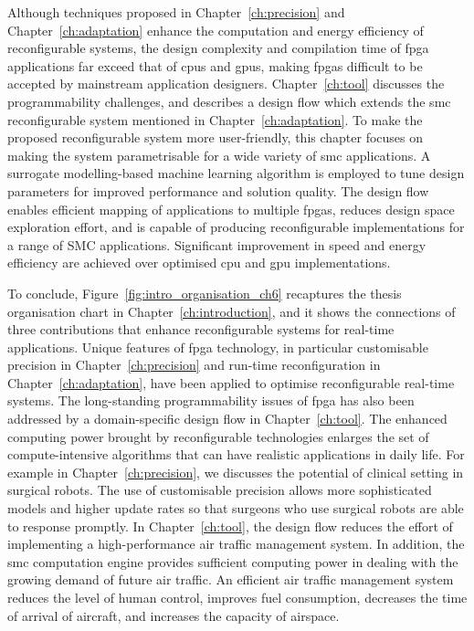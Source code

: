 Although techniques proposed in Chapter~\ref{ch:precision} and Chapter~\ref{ch:adaptation} enhance the computation and energy efficiency of reconfigurable systems,
the design complexity and compilation time of \gls{fpga} applications far exceed that of \glspl{cpu} and \glspl{gpu}, making \glspl{fpga} difficult to be accepted by mainstream application designers.
Chapter~\ref{ch:tool} discusses the programmability challenges, and describes a design flow which extends the \gls{smc} reconfigurable system mentioned in Chapter~\ref{ch:adaptation}.
To make the proposed reconfigurable system more user-friendly, this chapter focuses on making the system parametrisable for a wide variety of \gls{smc} applications.
A surrogate modelling-based machine learning algorithm is employed to tune design parameters for improved performance and solution quality. 
The design flow enables efficient mapping of applications to multiple \glspl{fpga}, reduces design space exploration effort, and is capable of producing reconfigurable implementations for a range of SMC applications.
Significant improvement in speed and energy efficiency are achieved over optimised \gls{cpu} and \gls{gpu} implementations.

To conclude, Figure~\ref{fig:intro_organisation_ch6} recaptures the thesis organisation chart in Chapter~\ref{ch:introduction}, and it shows the connections of three contributions that enhance reconfigurable systems for real-time applications.
Unique features of \gls{fpga} technology, in particular customisable precision in Chapter~\ref{ch:precision} and run-time reconfiguration in Chapter~\ref{ch:adaptation}, have been applied to optimise reconfigurable real-time systems.
The long-standing programmability issues of \gls{fpga} has also been addressed by a domain-specific design flow in Chapter~\ref{ch:tool}.
The enhanced computing power brought by reconfigurable technologies enlarges the set of compute-intensive algorithms that can have realistic applications in daily life.
For example in Chapter~\ref{ch:precision}, we discusses the potential of clinical setting in surgical robots.
The use of customisable precision allows more sophisticated models and higher update rates so that surgeons who use surgical robots are able to response promptly.
In Chapter~\ref{ch:tool}, the design flow reduces the effort of implementing a high-performance air traffic management system.
In addition, the \gls{smc} computation engine provides sufficient computing power in dealing with the growing demand of future air traffic.
An efficient air traffic management system reduces the level of human control, improves fuel consumption, decreases the time of arrival of aircraft, and increases the capacity of airspace.

